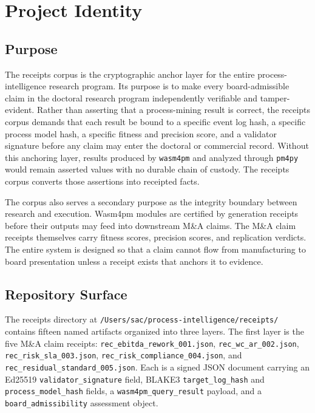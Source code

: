 \section{Project Identity}
\label{sec:receipts-identity}

\subsection{Purpose}
\label{sec:receipts-identity-purpose}

The receipts corpus is the cryptographic anchor layer for the entire process-intelligence research
program. Its purpose is to make every board-admissible claim in the doctoral research program
independently verifiable and tamper-evident. Rather than asserting that a process-mining result
is correct, the receipts corpus demands that each result be bound to a specific event log hash,
a specific process model hash, a specific fitness and precision score, and a validator signature
before any claim may enter the doctoral or commercial record. Without this anchoring layer, results
produced by \texttt{wasm4pm} and analyzed through \texttt{pm4py} would remain asserted values with
no durable chain of custody. The receipts corpus converts those assertions into receipted facts.

The corpus also serves a secondary purpose as the integrity boundary between research and
execution. Wasm4pm modules are certified by generation receipts before their outputs may feed
into downstream M\&A claims. The M\&A claim receipts themselves carry fitness scores, precision
scores, and replication verdicts. The entire system is designed so that a claim cannot flow from
manufacturing to board presentation unless a receipt exists that anchors it to evidence.

\subsection{Repository Surface}
\label{sec:receipts-identity-surface}

The receipts directory at \texttt{/Users/sac/process-intelligence/receipts/} contains fifteen
named artifacts organized into three layers. The first layer is the five M\&A claim receipts:
\texttt{rec\_ebitda\_rework\_001.json}, \texttt{rec\_wc\_ar\_002.json},
\texttt{rec\_risk\_sla\_003.json}, \texttt{rec\_risk\_compliance\_004.json}, and
\texttt{rec\_residual\_standard\_005.json}. Each is a signed JSON document carrying an Ed25519
\texttt{validator\_signature} field, BLAKE3 \texttt{target\_log\_hash} and
\texttt{process\_model\_hash} fields, a \texttt{wasm4pm\_query\_result} payload, and a
\texttt{board\_admissibility} assessment object.

